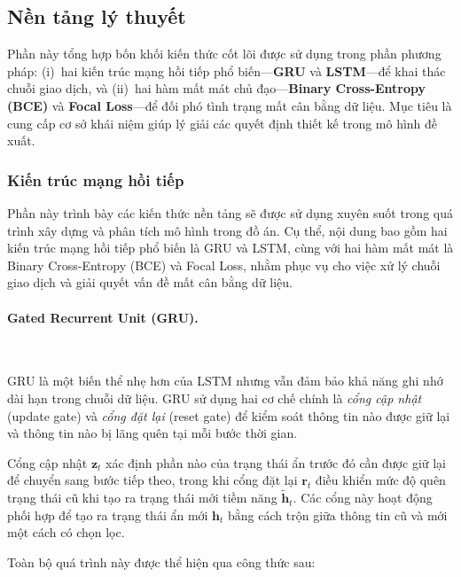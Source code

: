 \subsection{Nền tảng lý thuyết} \label{sec:theory}

Phần này tổng hợp bốn khối kiến thức cốt lõi được sử dụng trong phần phương pháp: (i)~hai kiến trúc mạng hồi tiếp phổ biến—\textbf{GRU} và \textbf{LSTM}—để khai thác chuỗi giao dịch, và (ii)~hai hàm mất mát chủ đạo—\textbf{Binary Cross-Entropy (BCE)} và \textbf{Focal Loss}—để đối phó tình trạng mất cân bằng dữ liệu. Mục tiêu là cung cấp cơ sở khái niệm giúp lý giải các quyết định thiết kế trong mô hình đề xuất.

\subsubsection{Kiến trúc mạng hồi tiếp}

Phần này trình bày các kiến thức nền tảng sẽ được sử dụng xuyên suốt trong quá trình xây dựng và phân tích mô hình trong đồ án. Cụ thể, nội dung bao gồm hai kiến trúc mạng hồi tiếp phổ biến là GRU và LSTM, cùng với hai hàm mất mát là Binary Cross-Entropy (BCE) và Focal Loss, nhằm phục vụ cho việc xử lý chuỗi giao dịch và giải quyết vấn đề mất cân bằng dữ liệu.

\paragraph{Gated Recurrent Unit (GRU).}~

\vspace{0.5em}

GRU là một biến thể nhẹ hơn của LSTM nhưng vẫn đảm bảo khả năng ghi nhớ dài hạn trong chuỗi dữ liệu. GRU sử dụng hai cơ chế chính là \textit{cổng cập nhật} (update gate) và \textit{cổng đặt lại} (reset gate) để kiểm soát thông tin nào được giữ lại và thông tin nào bị lãng quên tại mỗi bước thời gian.

Cổng cập nhật \(\mathbf{z}_t\) xác định phần nào của trạng thái ẩn trước đó cần được giữ lại để chuyển sang bước tiếp theo, trong khi cổng đặt lại \(\mathbf{r}_t\) điều khiển mức độ quên trạng thái cũ khi tạo ra trạng thái mới tiềm năng \(\tilde{\mathbf{h}}_t\). Các cổng này hoạt động phối hợp để tạo ra trạng thái ẩn mới \(\mathbf{h}_t\) bằng cách trộn giữa thông tin cũ và mới một cách có chọn lọc.

Toàn bộ quá trình này được thể hiện qua công thức sau:

